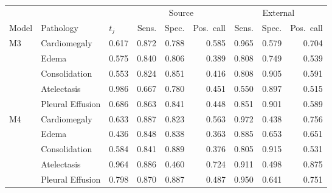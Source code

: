 \begin{tabular}{lllrrrrrr}
\toprule
 & & & \multicolumn{3}{c}{Source} & \multicolumn{3}{c}{External}\\
\cmidrule(lr){4-6}\cmidrule(lr){7-9}
Model & Pathology & $t_j$ & Sens. & Spec. & Pos.\ call & Sens. & Spec. & Pos.\ call\\
\midrule
M3 & Cardiomegaly & 0.617 & 0.872 & 0.788 & 0.585 & 0.965 & 0.579 & 0.704\\
 & Edema & 0.575 & 0.840 & 0.806 & 0.389 & 0.808 & 0.749 & 0.539\\
 & Consolidation & 0.553 & 0.824 & 0.851 & 0.416 & 0.808 & 0.905 & 0.591\\
 & Atelectasis & 0.986 & 0.667 & 0.780 & 0.451 & 0.550 & 0.897 & 0.515\\
 & Pleural Effusion & 0.686 & 0.863 & 0.841 & 0.448 & 0.851 & 0.901 & 0.589\\
\addlinespace
M4 & Cardiomegaly & 0.633 & 0.887 & 0.823 & 0.563 & 0.972 & 0.438 & 0.756\\
 & Edema & 0.436 & 0.848 & 0.838 & 0.363 & 0.885 & 0.653 & 0.651\\
 & Consolidation & 0.584 & 0.841 & 0.889 & 0.376 & 0.805 & 0.915 & 0.531\\
 & Atelectasis & 0.964 & 0.886 & 0.460 & 0.724 & 0.911 & 0.498 & 0.875\\
 & Pleural Effusion & 0.798 & 0.870 & 0.887 & 0.487 & 0.950 & 0.641 & 0.751\\
\bottomrule
\end{tabular}
